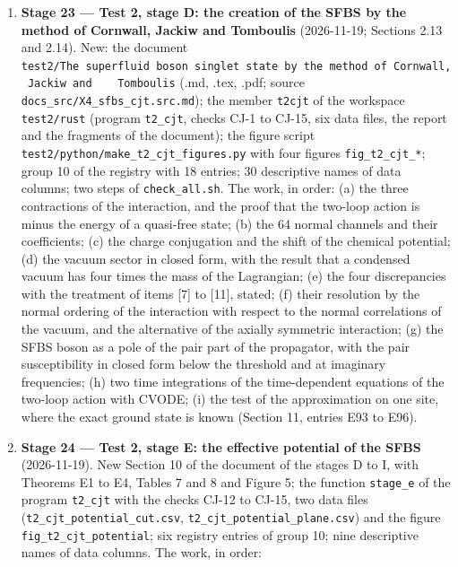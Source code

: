 \documentclass[
  10pt,
]{article}
\begin{document}
\begin{enumerate}
  2.19); two data files (\texttt{t2\_steps\_settled.csv},
  \texttt{t2\_steps\_last\_digits.csv}); one registry entry with six
  symbols (Section 11, entries E89 to E92).
\item
  \textbf{Stage 23 --- Test 2, stage D: the creation of the SFBS by the
  method of Cornwall, Jackiw and Tomboulis} (2026-11-19; Sections 2.13
  and 2.14). New: the document
  \texttt{test2/The\ superfluid\ boson\ singlet\ state\ by\ the\ method\ of\ Cornwall,\ Jackiw\ and\ \ \ \ Tomboulis}
  (.md, .tex, .pdf; source \texttt{docs\_src/X4\_sfbs\_cjt.src.md}); the
  member \texttt{t2cjt} of the workspace \texttt{test2/rust} (program
  \texttt{t2\_cjt}, checks CJ-1 to CJ-15, six data files, the report and
  the fragments of the document); the figure script
  \texttt{test2/python/make\_t2\_cjt\_figures.py} with four figures
  \texttt{fig\_t2\_cjt\_*}; group 10 of the registry with 18 entries; 30
  descriptive names of data columns; two steps of
  \texttt{check\_all.sh}. The work, in order: (a) the three contractions
  of the interaction, and the proof that the two-loop action is minus
  the energy of a quasi-free state; (b) the 64 normal channels and their
  coefficients; (c) the charge conjugation and the shift of the chemical
  potential; (d) the vacuum sector in closed form, with the result that
  a condensed vacuum has four times the mass of the Lagrangian; (e) the
  four discrepancies with the treatment of items {[}7{]} to {[}11{]},
  stated; (f) their resolution by the normal ordering of the interaction
  with respect to the normal correlations of the vacuum, and the
  alternative of the axially symmetric interaction; (g) the SFBS boson
  as a pole of the pair part of the propagator, with the pair
  susceptibility in closed form below the threshold and at imaginary
  frequencies; (h) two time integrations of the time-dependent equations
  of the two-loop action with CVODE; (i) the test of the approximation
  on one site, where the exact ground state is known (Section 11,
  entries E93 to E96).
\item
  \textbf{Stage 24 --- Test 2, stage E: the effective potential of the
  SFBS} (2026-11-19). New Section 10 of the document of the stages D to
  I, with Theorems E1 to E4, Tables 7 and 8 and Figure 5; the function
  \texttt{stage\_e} of the program \texttt{t2\_cjt} with the checks
  CJ-12 to CJ-15, two data files (\texttt{t2\_cjt\_potential\_cut.csv},
  \texttt{t2\_cjt\_potential\_plane.csv}) and the figure
  \texttt{fig\_t2\_cjt\_potential}; six registry entries of group 10;
  nine descriptive names of data columns. The work, in order:
\end{enumerate}
\end{document}
